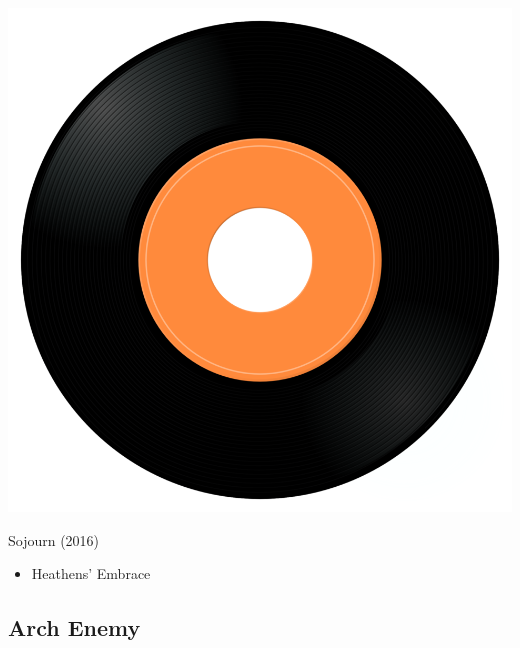 \begin{minipage}[t]{0.25\textwidth}\vspace{0pt}
\captionsetup{type=figure}
\includegraphics[width=\textwidth]{Images/cover.png}
\caption*{Sojourn (2016)}
\end{minipage}
\begin{minipage}[t]{0.25\textwidth}\vspace{0pt}
\begin{itemize}[nosep,leftmargin=1em,labelwidth=*,align=left]
	\setlength{\itemsep}{0pt}
	\item Heathens' Embrace
\end{itemize}
\end{minipage}

\subsection{Arch Enemy}

